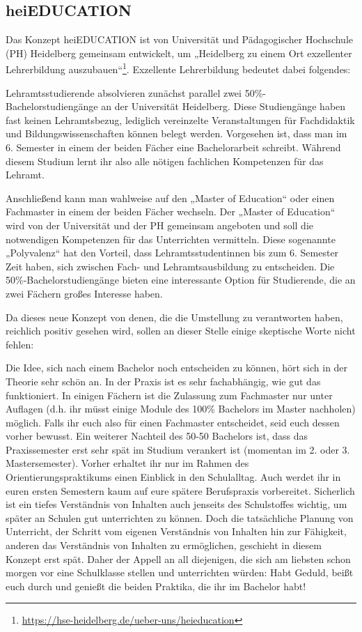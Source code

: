 \subsection{heiEDUCATION}

Das Konzept heiEDUCATION ist von Universität und Pädagogischer Hochschule (PH) Heidelberg gemeinsam entwickelt, um „Heidelberg zu einem Ort exzellenter Lehrerbildung auszubauen“\footnote{\url{https://hse-heidelberg.de/ueber-uns/heieducation}}. Exzellente Lehrerbildung bedeutet dabei folgendes:

Lehramtsstudierende absolvieren zunächst parallel zwei 50\%-Ba\-che\-lor\-stu\-di\-en\-gän\-ge an der Universität Heidelberg. Diese Studiengänge haben fast keinen Lehramtsbezug, lediglich vereinzelte Veranstaltungen für Fachdidaktik und Bildungswissenschaften können belegt werden. Vorgesehen ist, dass man im 6. Semester in einem der beiden Fächer eine Bachelorarbeit schreibt. Während diesem Studium lernt ihr also alle nötigen fachlichen Kompetenzen für das Lehramt.

Anschließend kann man wahlweise auf den „Master of Education“ oder einen Fachmaster in einem der beiden Fächer wechseln. Der „Master of Education“ wird von der Universität und der PH gemeinsam angeboten und soll die notwendigen Kompetenzen für das Unterrichten vermitteln. Diese sogenannte „Polyvalenz“ hat den Vorteil, dass Lehramtsstudentinnen bis zum 6. Semester Zeit haben, sich zwischen Fach- und Lehramtsausbildung zu entscheiden. Die 50\%-Bachelorstudiengänge bieten eine interessante Option für Studierende, die an zwei Fächern großes Interesse haben.

Da dieses neue Konzept von denen, die die Umstellung zu verantworten haben, reichlich positiv gesehen wird, sollen an dieser Stelle einige skeptische Worte nicht fehlen:

Die Idee, sich nach einem Bachelor noch entscheiden zu können, hört sich in der Theorie sehr schön an. In der Praxis ist es sehr fachabhängig, wie gut das funktioniert. In einigen Fächern ist die Zulassung zum Fachmaster nur unter Auflagen (d.h. ihr müsst einige Module des 100\% Bachelors im Master  nachholen) möglich. Falls ihr euch also für einen Fachmaster entscheidet, seid euch dessen vorher bewusst.
Ein weiterer Nachteil des 50-50 Bachelors ist, dass das Praxissemester erst sehr spät im Studium verankert ist (momentan im 2. oder 3. Mastersemester). Vorher erhaltet ihr nur im Rahmen des Orientierungspraktikums einen Einblick in den Schulalltag. Auch werdet ihr in euren ersten Semestern kaum auf eure spätere Berufspraxis vorbereitet. Sicherlich ist ein tiefes Verständnis von Inhalten auch jenseits des Schulstoffes wichtig, um später an Schulen gut unterrichten zu können. Doch die tatsächliche Planung von Unterricht, der Schritt vom eigenen Verständnis von Inhalten hin zur Fähigkeit, anderen das Verständnis von Inhalten zu ermöglichen, geschieht in diesem Konzept erst spät. Daher der Appell an all diejenigen, die sich am liebsten schon morgen vor eine Schulklasse stellen und unterrichten würden: Habt Geduld, beißt euch durch und genießt die beiden Praktika, die ihr im Bachelor habt!

